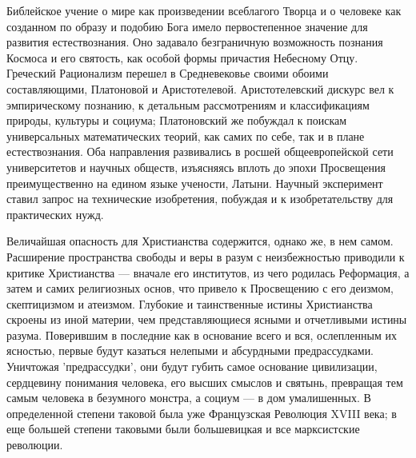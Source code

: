 \begin{multicols}{3}
Библейское учение о мире как произведении всеблагого Творца и о человеке как
созданном по образу и подобию Бога имело первостепенное значение для развития
естествознания. Оно задавало безграничную возможность познания Космоса и его
святость, как особой формы причастия Небесному Отцу. Греческий Рационализм
перешел в Средневековье своими обоими составляющими, Платоновой и
Аристотелевой. Аристотелевский дискурс вел к эмпирическому познанию, к
детальным рассмотрениям и классификациям природы, культуры и социума;
Платоновский же побуждал к поискам универсальных математических теорий, как
самих по себе, так и в плане естествознания. Оба направления развивались в
росшей общеевропейской сети университетов и научных обществ, изъясняясь вплоть
до эпохи Просвещения преимущественно на едином языке учености, Латыни. Научный
эксперимент ставил запрос на технические изобретения, побуждая и к
изобретательству для практических нужд.

Величайшая опасность для Христианства содержится, однако же, в нем самом.
Расширение пространства свободы и веры в разум с неизбежностью приводили к
критике Христианства — вначале его институтов, из чего родилась Реформация, а
затем и самих религиозных основ, что привело к Просвещению с его деизмом,
скептицизмом и атеизмом. Глубокие и таинственные истины Христианства скроены из
иной материи, чем представляющиеся ясными и отчетливыми истины разума.
Поверившим в последние как в основание всего и вся, ослепленным их ясностью,
первые будут казаться нелепыми и абсурдными предрассудками. Уничтожая
'предрассудки', они будут губить самое основание цивилизации, сердцевину
понимания человека, его высших смыслов и святынь, превращая тем самым человека
в безумного монстра, а социум — в дом умалишенных. В определенной степени
таковой была уже Французская Революция XVIII века; в еще большей степени
таковыми были большевицкая и все марксистские революции.


\end{multicols}
